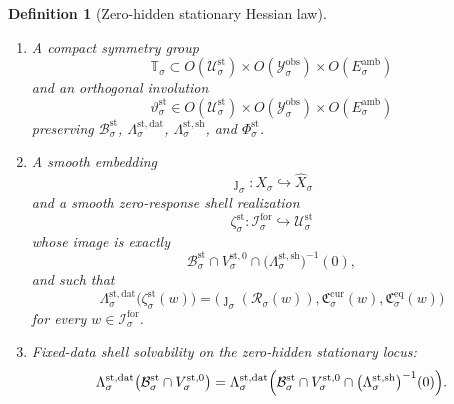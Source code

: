 \documentclass[11pt]{article}
\newcommand{\ForSpace}[1]{\mathcal I_{#1}^{\mathrm{for}}}
\newcommand{\Reduction}[1]{\mathcal R_{#1}}
\newcommand{\CurrentCarrier}[1]{\mathfrak C_{#1}^{\mathrm{cur}}}
\newcommand{\EqCarrier}[1]{\mathfrak C_{#1}^{\mathrm{eq}}}
\newcommand{\VisibleAffine}[1]{\widehat X_{#1}}
\newcommand{\DataSpace}[1]{\mathcal Y_{#1}^{\mathrm{obs}}}
\newcommand{\AmbientTarget}[1]{E_{#1}^{\mathrm{amb}}}
\newcommand{\StatSpace}[1]{\mathcal U_{#1}^{\mathrm{st}}}
\newcommand{\StatBody}[1]{\mathcal B_{#1}^{\mathrm{st}}}
\newcommand{\StatData}[1]{\Lambda_{#1}^{\mathrm{st,dat}}}
\newcommand{\StatShell}[1]{\Lambda_{#1}^{\mathrm{st,sh}}}
\newcommand{\StatPotential}[1]{\Phi_{#1}^{\mathrm{st}}}
\newcommand{\StatZero}[1]{V_{#1}^{\mathrm{st},0}}
\newcommand{\StatHidden}[1]{H_{#1}^{\mathrm{st}}}
\newcommand{\StatHess}[1]{\mathfrak H_{#1}^{\mathrm{st}}}
\newcommand{\StatSym}[1]{\mathbb T_{#1}}
\newcommand{\StatTime}[1]{\vartheta_{#1}^{\mathrm{st}}}
\newcommand{\StatEmbed}[1]{\zeta_{#1}^{\mathrm{st}}}
\newtheorem{definition}{Definition}
\begin{document}
\begin{definition}[Zero-hidden stationary Hessian law]
\begin{enumerate}
\begin{equation}
    D\StatPotential{\sigma}(z)=0,
    \qquad
    D^{2}\StatPotential{\sigma}(z)[u,v]
    =
    \StatHess{\sigma}(u,v)
    \label{eq:commonhessian}
    \end{equation}
    for all \(u,v\in\StatSpace{\sigma}\). Assume moreover that
    \begin{equation}
    \StatHess{\sigma}(\delta z,u)=0
    \qquad
    \text{for all }\delta z\in\StatZero{\sigma},\;u\in\StatSpace{\sigma},
    \label{eq:hesszero}
    \end{equation}
    and that there exists \(\lambda_{\sigma}^{\mathrm{st}}>0\) with
    \begin{equation}
    \StatHess{\sigma}(\eta,\eta)
    \ge
    \lambda_{\sigma}^{\mathrm{st}}\,
    \|\eta\|^{2}
    \qquad
    \text{for all }\eta\in\StatHidden{\sigma}.
    \label{eq:stgap}
    \end{equation}
    \item A compact symmetry group
    \[
    \StatSym{\sigma}\subset
    O(\StatSpace{\sigma})\times
    O(\DataSpace{\sigma})\times
    O(\AmbientTarget{\sigma})
    \]
    and an orthogonal involution
    \[
    \StatTime{\sigma}\in
    O(\StatSpace{\sigma})\times
    O(\DataSpace{\sigma})\times
    O(\AmbientTarget{\sigma})
    \]
    preserving \(\StatBody{\sigma}\), \(\StatData{\sigma}\), \(\StatShell{\sigma}\), and \(\StatPotential{\sigma}\).
    \item A smooth embedding
    \[
    \jmath_{\sigma}:X_{\sigma}\hookrightarrow\VisibleAffine{\sigma}
    \]
    and a smooth zero-response shell realization
    \[
    \StatEmbed{\sigma}:\ForSpace{\sigma}\hookrightarrow\StatSpace{\sigma}
    \]
    whose image is exactly
    \[
    \StatBody{\sigma}\cap
    \StatZero{\sigma}\cap
    \bigl(\StatShell{\sigma}\bigr)^{-1}(0),
    \]
    and such that
    \begin{equation}
    \StatData{\sigma}\bigl(\StatEmbed{\sigma}(w)\bigr)
    =
    \bigl(
    \jmath_{\sigma}(\Reduction{\sigma}(w)),
    \CurrentCarrier{\sigma}(w),
    \EqCarrier{\sigma}(w)
    \bigr)
    \label{eq:statcompat}
    \end{equation}
    for every \(w\in\ForSpace{\sigma}\).
    \item Fixed-data shell solvability on the zero-hidden stationary locus:
    \begin{equation}
    \StatData{\sigma}\bigl(
    \StatBody{\sigma}\cap\StatZero{\sigma}
    \bigr)
    =
    \StatData{\sigma}\Bigl(
    \StatBody{\sigma}\cap
    \StatZero{\sigma}\cap
    \bigl(\StatShell{\sigma}\bigr)^{-1}(0)
    \Bigr).

\end{equation}
\end{enumerate}
\end{definition}
\end{document}
